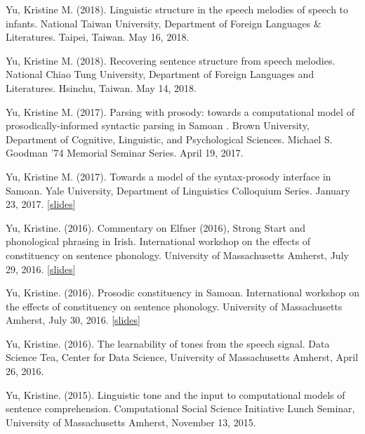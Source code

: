 \documentclass[10pt]{article}
\begin{document}
\begin{bibenum}

\item Yu, Kristine M. (2018). Linguistic structure in the speech melodies of speech to infants. National Taiwan University, Department of Foreign Languages \& Literatures. Taipei, Taiwan. May 16, 2018. 
  
\item Yu, Kristine M. (2018). Recovering sentence structure from speech melodies. National Chiao Tung University, Department of Foreign Languages and Literatures. Hsinchu, Taiwan. May 14, 2018.
  
\item Yu, Kristine M. (2017). Parsing with prosody: towards a computational model of prosodically-informed syntactic parsing in Samoan
. Brown University, Department of
  Cognitive, Linguistic, and Psychological Sciences. Michael S. Goodman '74 Memorial Seminar Series. April 19, 2017.  
\item Yu, Kristine M. (2017). Towards a model of the syntax-prosody interface in Samoan. Yale University, Department of
  Linguistics Colloquium Series. January 23, 2017. [\href{https://speakerdeck.com/krisyu/towards-a-model-of-the-samoan-syntax-prosody-interface}{slides}]
  \item Yu, Kristine. (2016). Commentary on Elfner (2016), Strong
    Start and phonological phrasing in Irish. International workshop on the effects of
    constituency on sentence phonology. University of Massachusetts
    Amherst, July 29, 2016. [\href{https://speakerdeck.com/krisyu/commentary-on-elfners-strong-start-and-phonological-phrasing-in-irish}{slides}]

  \item Yu, Kristine. (2016). Prosodic constituency in Samoan. International workshop on the effects of
    constituency on sentence phonology. University of Massachusetts
    Amherst, July 30, 2016. [\href{https://speakerdeck.com/krisyu/prosodic-constituency-in-samoan}{slides}]

  \item Yu, Kristine. (2016). The learnability of tones from the
    speech signal. Data Science Tea, Center for Data
    Science, University of Massachusetts Amherst, April 26, 2016.

  \item Yu, Kristine. (2015). Linguistic tone and the input to
    computational models of sentence comprehension. Computational
    Social Science Initiative Lunch Seminar, University of
    Massachusetts Amherst, November 13, 2015.


\end{bibenum}
\end{document}
